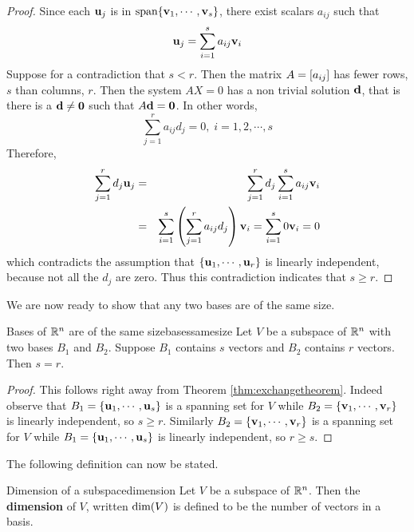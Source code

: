 \begin{proof}
Since each ${\bf u}_j$ is in $\mbox{span}\{{\bf v}_{1},\cdots ,{\bf v}_{s}\} 
$, there exist scalars $a_{ij}$ such that 
\begin{equation*}
{\bf u}_{j}=\sum_{i=1}^{s}a_{ij}{\bf v}_{i}
\end{equation*}
Suppose for a contradiction that $s<r$. Then the matrix $A = \left[
a_{ij} \right]$ has fewer rows, $s$ than columns, $r$. Then the system
$AX=0$ has %
a non trivial solution ${\bf d}$, that is there is a  ${\bf d}\neq {\bf 0}$ such that  $A{\bf d}={\bf 0}$. In other
words, 
\begin{equation*}
\sum_{j=1}^{r}a_{ij}d_{j}=0,\;i=1,2,\cdots ,s
\end{equation*}
Therefore, 
\begin{eqnarray*}
\sum_{j=1}^{r}d_{j}{\bf u}_{j} &=&\sum_{j=1}^{r}d_{j}\sum_{i=1}^{s}a_{ij}
{\bf v}_{i} \\
&=&\sum_{i=1}^{s}\left( \sum_{j=1}^{r}a_{ij}d_{j}\right) {\bf v}
_{i}=\sum_{i=1}^{s}0{\bf v}_{i}=0
\end{eqnarray*}
which contradicts the assumption that $\{{\bf u}_{1},\cdots ,{\bf u}_{r}\} $
is linearly independent, because not all the $d_{j}$ are zero. Thus this contradiction indicates that $s\geq r$. 
\end{proof}

We are now ready to show that any two bases are of the same size. 

\begin{theorem}{Bases of $\mathbb{R}^{n}$ are of the same size}{basessamesize}
Let $V$ be a subspace of $\mathbb{R}^{n}$ with two bases $B_1$ and $B_2$. Suppose $B_1$ contains $s$ vectors and $B_2$ contains $r$ vectors. Then $s=r.$
\end{theorem}

\begin{proof}
This follows right away from Theorem \ref{thm:exchangetheorem}. Indeed
observe that $B_1 = \{
{\bf u}_{1},\cdots ,{\bf u}_{s}\} $ is a spanning set for $V$ while $
B_2 = \{{\bf v}_{1},\cdots ,{\bf v}_{r}\} $ is linearly
independent, so $s \geq r.$ Similarly $B_2 = \{{\bf v}_{1},\cdots ,{\bf v}
_{r}\} $ is a spanning set for $V$ while $B_1 = \{{\bf u}_{1},\cdots ,
{\bf u}_{s}\} $ is linearly independent,  so $r\geq s$.
\end{proof}

The following definition can now be stated.

\begin{definition}{Dimension of a subspace}{dimension}
Let $V$ be a subspace of $\mathbb{R}^{n}$. Then the \textbf{dimension }of $V$, written $\mbox{dim}(V)$
is defined to be the number of vectors in a basis.
\end{definition}

